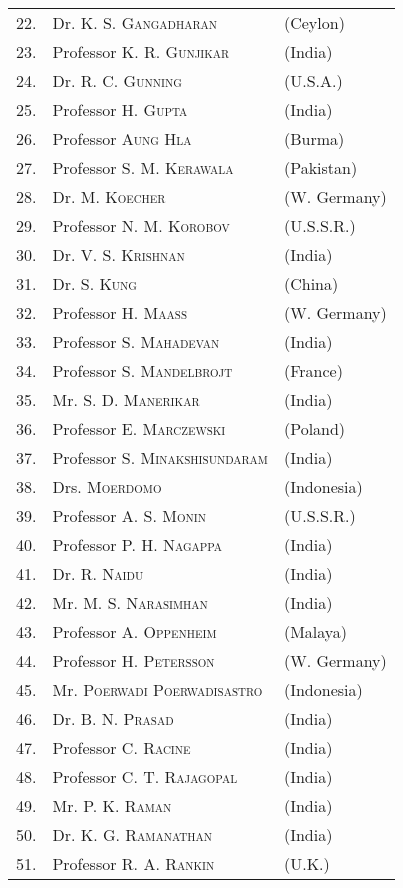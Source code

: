 \begin{longtable}[l]{r@{\;\,}ll}
22. & Dr. \textsc{K. S. Gangadharan} & (Ceylon)\\
23. & Professor \textsc{K. R. Gunjikar} & (India)\\
24. & Dr. \textsc{R. C. Gunning} & (U.S.A.)\\
25. & Professor \textsc{H. Gupta} & (India)\\
26. & Professor \textsc{Aung Hla} & (Burma)\\
27. & Professor \textsc{S. M. Kerawala} & (Pakistan)\\
28. & Dr. \textsc{M. Koecher} & (W. Germany)\\
29. & Professor \textsc{N. M. Korobov} & (U.S.S.R.)\\
30. & Dr. \textsc{V. S. Krishnan} & (India)\\
31. & Dr. \textsc{S. Kung} & (China)\\
32. & Professor \textsc{H. Maass} & (W. Germany)\\
33. & Professor \textsc{S. Mahadevan} & (India)\\
34. & Professor \textsc{S. Mandelbrojt} & (France)\\
35. & Mr. \textsc{S. D. Manerikar} & (India)\\
36. & Professor \textsc{E. Marczewski} & (Poland)\\
37. & Professor \textsc{S. Minakshisundaram} & (India)\\
38. & Drs. \textsc{Moerdomo} & (Indonesia)\\
39. & Professor \textsc{A. S. Monin} & (U.S.S.R.)\\
40. & Professor \textsc{P. H. Nagappa} & (India)\\
41. & Dr. \textsc{R. Naidu} & (India)\\
42. & Mr. \textsc{M. S. Narasimhan} & (India)\\
43. & Professor \textsc{A. Oppenheim} & (Malaya)\\
44. & Professor \textsc{H. Petersson} & (W. Germany)\\
45. & Mr. \textsc{Poerwadi Poerwadisastro} & (Indonesia)\\
46. & Dr. \textsc{B. N. Prasad} & (India)\\
47. & Professor \textsc{C. Racine} & (India)\\
48. & Professor \textsc{C. T. Rajagopal} & (India)\\
49. & Mr. \textsc{P. K. Raman} & (India)\\
50. & Dr. \textsc{K. G. Ramanathan} & (India)\\
51. & Professor \textsc{R. A. Rankin} & (U.K.)\\

\end{longtable}
